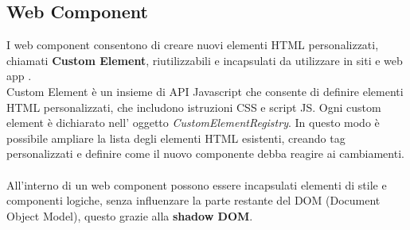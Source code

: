 \subsection{Web Component}
I web component consentono di creare nuovi elementi HTML personalizzati, chiamati \textbf{Custom Element}, riutilizzabili e incapsulati
da utilizzare in siti e web app \cite{webcomponents}.\\
Custom Element è un insieme di API Javascript che consente di definire elementi HTML personalizzati, che includono istruzioni CSS e script JS.
Ogni custom element è dichiarato nell' oggetto \emph{CustomElementRegistry}.
In questo modo è possibile ampliare la lista degli elementi HTML esistenti, creando 
tag personalizzati e definire come il nuovo componente debba reagire ai cambiamenti.
\\\\
All'interno di un web component possono essere incapsulati elementi di stile e componenti logiche, senza influenzare
la parte restante del DOM (Document Object Model), questo grazie alla \textbf{shadow DOM}.

